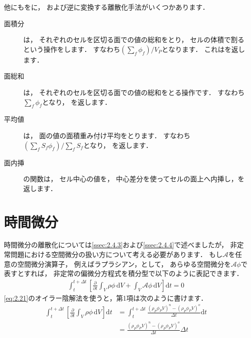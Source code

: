 他にもをに，
および逆に変換する離散化手法がいくつかあります．
\begin{description}
 \item[面積分] は，
            それぞれのセルを区切る面での値の総和をとり，
            セルの体積で割るという操作をします．
            すなわち$(\sum_{f}\phi_{f})/V_{P}$となります．
            これはを返します．
 \item[面総和] は，
            それぞれのセルを区切る面での値の総和をとる操作です．
            すなわち$\sum_{f}\phi_{f}$となり，
            を返します．
 \item[平均値] は，
            面の値の面積重み付け平均をとります．
            すなわち$(\sum_{f}S_{f}\phi_{f})/\sum_{f}S_{f}$となり，
            を返します．
 \item[面内挿] の関数は，
            セル中心の値を，
            中心差分を使ってセルの面上へ内挿し，を返します．
\end{description}



\section{時間微分}
\label{sec:2.5}
%  
%  
時間微分の離散化については\autoref{ssec:2.4.3}および\autoref{ssec:2.4.4}で述べましたが，
非定常問題における空間微分の扱い方について考える必要があります．
もし$\mathcal{A}$を任意の空間微分演算子，
例えばラプラシアン，として，
あらゆる空間微分を$\mathcal{A}\phi$で表すとすれば，
非定常の偏微分方程式を積分型で以下のように表記できます．
\begin{align}
 \label{eq:2.30}
 \int_{t}^{t + \Delta t}\left[\frac{\partial}{\partial t}\int_{V}\rho\phi\,\mathrm{d}V
 + \int_{V}\mathcal{A}\phi\,\mathrm{d}V\right]\mathrm{d}t = 0
\end{align}
\autoref{eq:2.21}のオイラー陰解法を使うと，第1項は次のように書けます．
\begin{align}
 \label{eq:2.31}
 \int_{t}^{t + \Delta t}
 \left[\frac{\partial}{\partial t}\int_{V}\rho\phi\,\mathrm{d}V\right]\mathrm{d}t
 &= \int_{t}^{t + \Delta t}
 \frac{(\rho_{P}\phi_{P}V)^{n} - (\rho_{P}\phi_{P}V)^{o}}{\Delta t}\mathrm{d}t \\
 &= \frac{(\rho_{P}\phi_{P}V)^{n} - (\rho_{P}\phi_{P}V)^{o}}{\Delta t}\Delta t
\end{align}

